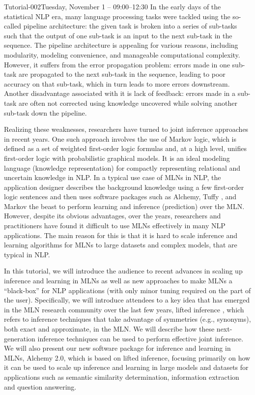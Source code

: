 \begin{tutorial}{Tutorial-002}{Tuesday, November 1 -- 09:00--12:30}
{\TutLocB}
	In the early days of the statistical NLP era, many language processing tasks were tackled using the so-called pipeline architecture: the given task is broken into a series of sub-tasks such that the output of one sub-task is an input to the next sub-task in the sequence. The pipeline architecture is appealing for various reasons, including modularity, modeling convenience, and manageable computational complexity. However, it suffers from the error propagation problem: errors made in one sub-task are propagated to the next sub-task in the sequence, leading to poor accuracy on that sub-task, which in turn leads to more errors downstream. Another disadvantage associated with it is lack of feedback: errors made in a sub-task are often not corrected using knowledge uncovered while solving another sub-task down the pipeline.

Realizing these weaknesses, researchers have turned to joint inference approaches in recent years. One such approach involves the use of Markov logic, which is defined as a set of weighted first-order logic formulas and, at a high level, unifies first-order logic with probabilistic graphical models. It is an ideal modeling language (knowledge representation) for compactly representing relational and uncertain knowledge in NLP. In a typical use case of MLNs in NLP, the application designer describes the background knowledge using a few first-order logic sentences and then uses software packages such as Alchemy, Tuffy , and Markov the beast to perform learning and inference (prediction) over the MLN. However, despite its obvious advantages, over the years, researchers and practitioners have found it difficult to use MLNs effectively in many NLP applications. The main reason for this is that it is hard to scale inference and learning algorithms for MLNs to large datasets and complex models, that are typical in NLP.

In this tutorial, we will introduce the audience to recent advances in scaling up inference and learning in MLNs as well as new approaches to make MLNs a “black-box” for NLP applications (with only minor tuning required on the part of the user). Specifically, we will introduce attendees to a key idea that has emerged in the MLN research community over the last few years, lifted inference , which refers to inference techniques that take advantage of symmetries (e.g., synonyms), both exact and approximate, in the MLN. We will describe how these next-generation inference techniques can be used to perform effective joint inference. We will also present our new software package for inference and learning in MLNs, Alchemy 2.0, which is based on lifted inference, focusing primarily on how it can be used to scale up inference and learning in large models and datasets for applications such as semantic similarity determination, information extraction and question answering. 
\end{tutorial} 

